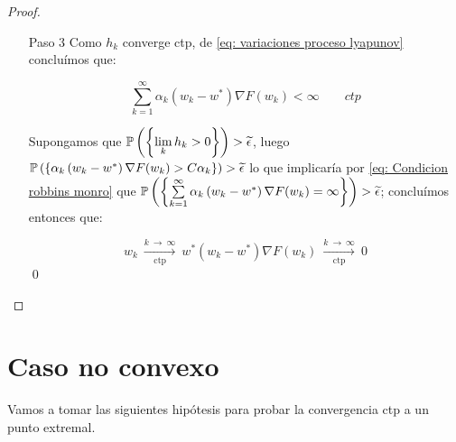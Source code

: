 \begin{proof}
\begin{enumerate}
		\item[Paso 3] Como $h_k$ converge ctp, de \ref{eq: variaciones proceso lyapunov} conclu\'imos que:
		
		\begin{equation*}
		\sum\limits_{k=1}^{\infty} {\alpha_k \left(w_k - w^* \right)\nabla F(w_k)} < \infty \qquad ctp
		\end{equation*}
		
		Supongamos que $\mathbb{P}\left(\left\lbrace\lim\limits_{k} {h_k} > 0\right\rbrace\right) > \widetilde{\epsilon}$, luego $\mathbb{P}\left(\left\lbrace\alpha_k \left(w_k - w^* \right)\nabla F(w_k) > C\alpha_k\right\rbrace\right) > \widetilde{\epsilon}$ lo que implicar\'ia por \ref{eq: Condicion robbins monro} que $\mathbb{P}\left(\left\lbrace\sum\limits_{k=1}^{\infty} {\alpha_k \left(w_k - w^* \right)\nabla F(w_k)} = \infty\right\rbrace\right) > \widetilde{\epsilon}$; conclu\'imos entonces que:
		
			\begin{subequations}
			\begin{equation}
			w_k \ \xrightarrow[\text{ctp}]{k \ \rightarrow \ \infty } \ w^*
			\end{equation}
			\begin{equation}
			\left(w_k - w^*\right) \nabla F(w_k) \ \xrightarrow[\text{ctp}]{k \ \rightarrow \ \infty } \ 0
			\end{equation}
		\end{subequations}\qed
		
	\end{enumerate}
	
\end{proof}

\section{Caso no convexo}

Vamos a tomar las siguientes hip\'otesis para probar la convergencia ctp a un punto extremal.

